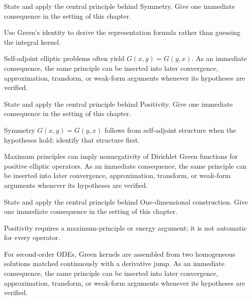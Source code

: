\begin{exercise}\label{exr:iii25-04}
State and apply the central principle behind Symmetry. Give one immediate consequence in the setting of this chapter.
\end{exercise}
\begin{hint}
Use Green's identity to derive the representation formula rather than guessing the integral kernel.
\end{hint}
\begin{solution}
Self-adjoint elliptic problems often yield $G(x,y)=G(y,x)$. As an immediate consequence, the same principle can be inserted into later convergence, approximation, transform, or weak-form arguments whenever its hypotheses are verified.
\end{solution}

\begin{exercise}\label{exr:iii25-05}
State and apply the central principle behind Positivity. Give one immediate consequence in the setting of this chapter.
\end{exercise}
\begin{hint}
Symmetry \(G(x,y)=G(y,x)\) follows from self-adjoint structure when the hypotheses hold; identify that structure first.
\end{hint}
\begin{solution}
Maximum principles can imply nonnegativity of Dirichlet Green functions for positive elliptic operators. As an immediate consequence, the same principle can be inserted into later convergence, approximation, transform, or weak-form arguments whenever its hypotheses are verified.
\end{solution}

\begin{exercise}\label{exr:iii25-06}
State and apply the central principle behind One-dimensional construction. Give one immediate consequence in the setting of this chapter.
\end{exercise}
\begin{hint}
Positivity requires a maximum-principle or energy argument; it is not automatic for every operator.
\end{hint}
\begin{solution}
For second-order ODEs, Green kernels are assembled from two homogeneous solutions matched continuously with a derivative jump. As an immediate consequence, the same principle can be inserted into later convergence, approximation, transform, or weak-form arguments whenever its hypotheses are verified.
\end{solution}

